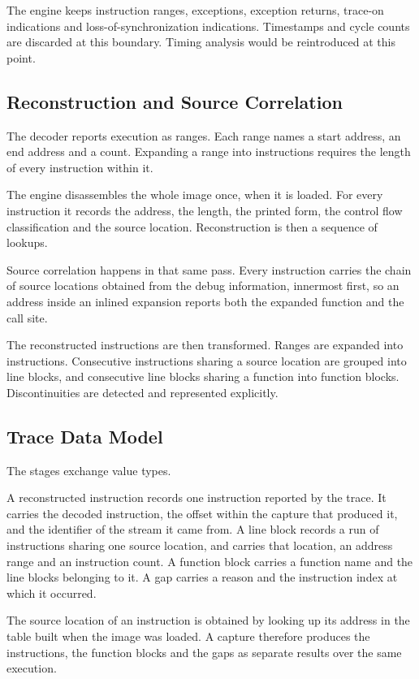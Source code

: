 The engine keeps instruction ranges, exceptions, exception returns, trace-on indications and loss-of-synchronization indications. Timestamps and cycle counts are discarded at this boundary. Timing analysis would be reintroduced at this point.

\subsection{Reconstruction and Source Correlation}
The decoder reports execution as ranges. Each range names a start address, an end address and a count. Expanding a range into instructions requires the length of every instruction within it.

The engine disassembles the whole image once, when it is loaded. For every instruction it records the address, the length, the printed form, the control flow classification and the source location. Reconstruction is then a sequence of lookups.

Source correlation happens in that same pass. Every instruction carries the chain of source locations obtained from the debug information, innermost first, so an address inside an inlined expansion reports both the expanded function and the call site.

The reconstructed instructions are then transformed. Ranges are expanded into instructions. Consecutive instructions sharing a source location are grouped into line blocks, and consecutive line blocks sharing a function into function blocks. Discontinuities are detected and represented explicitly.

\subsection{Trace Data Model}
The stages exchange value types.

A reconstructed instruction records one instruction reported by the trace. It carries the decoded instruction, the offset within the capture that produced it, and the identifier of the stream it came from. A line block records a run of instructions sharing one source location, and carries that location, an address range and an instruction count. A function block carries a function name and the line blocks belonging to it. A gap carries a reason and the instruction index at which it occurred.

The source location of an instruction is obtained by looking up its address in the table built when the image was loaded. A capture therefore produces the instructions, the function blocks and the gaps as separate results over the same execution.

